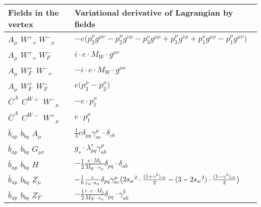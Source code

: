 \textwidth 17cm
\textheight 25cm
\hoffset -3cm
\voffset -1cm
\pagestyle{empty}

\begin{center}

\begin{tabular}{|l|l|} \hline
Fields in the vertex & Variational derivative of Lagrangian by fields \\ \hline
${A}_{\mu }$ \phantom{-} $W^+{}_{\nu }$ \phantom{-} $W^-{}_{\rho }$ \phantom{-}  &
	$- e\big(p_2^\rho g^{\mu \nu} -p_2^\mu g^{\nu \rho} -p_3^\nu g^{\mu \rho} +p_3^\mu g^{\nu \rho} +p_1^\nu g^{\mu \rho} -p_1^\rho g^{\mu \nu} \big)$\\[2mm]
${A}_{\mu }$ \phantom{-} $W^+{}_{\nu }$ \phantom{-} $W^-_F{}_{}$ \phantom{-}  &
	$ i \cdot e \cdot M_W\cdot g^{\mu \nu} $\\[2mm]
${A}_{\mu }$ \phantom{-} $W^+_F{}_{}$ \phantom{-} $W^-{}_{\nu }$ \phantom{-}  &
	$- i \cdot e \cdot M_W\cdot g^{\mu \nu} $\\[2mm]
${A}_{\mu }$ \phantom{-} $W^+_F{}_{}$ \phantom{-} $W^-_F{}_{}$ \phantom{-}  &
	$ e\big(p_3^\mu -p_2^\mu \big)$\\[2mm]
$\bar{C}^A{}_{}$ \phantom{-} $C^{W+}{}_{}$ \phantom{-} $W^-{}_{\mu }$ \phantom{-}  &
	$- e\cdot p_1^\mu $\\[2mm]
$\bar{C}^A{}_{}$ \phantom{-} $C^{W-}{}_{}$ \phantom{-} $W^+{}_{\mu }$ \phantom{-}  &
	$ e\cdot p_1^\mu $\\[2mm]
$\bar{b}{}_{a p }$ \phantom{-} $b{}_{b q }$ \phantom{-} ${A}_{\mu }$ \phantom{-}  &
	$\frac{1}{3} e\delta_{p q} \gamma_{a c}^\mu \cdot \delta_{c b} $\\[2mm]
$\bar{b}{}_{a p }$ \phantom{-} $b{}_{b q }$ \phantom{-} ${G}_{\mu r }$ \phantom{-}  &
	$ g_s\cdot \lambda_{p q}^r \gamma_{a b}^\mu $\\[2mm]
$\bar{b}{}_{a p }$ \phantom{-} $b{}_{b q }$ \phantom{-} ${H}_{}$ \phantom{-}  &
	$-\frac{1}{2}\frac{ e \cdot M_b}{ M_W \cdot s_w}\delta_{p q} \cdot \delta_{a b} $\\[2mm]
$\bar{b}{}_{a p }$ \phantom{-} $b{}_{b q }$ \phantom{-} ${Z}_{\mu }$ \phantom{-}  &
	$-\frac{1}{6}\frac{ e}{ c_w \cdot s_w}\delta_{p q} \gamma_{a c}^\mu \big(2 s_w{}^2 \cdot {(1+\gamma^5)_{c b}\over 2} - (3-2 s_w {}^2)\cdot {(1-\gamma^5)_{c b}\over 2} \big)$\\[2mm]
$\bar{b}{}_{a p }$ \phantom{-} $b{}_{b q }$ \phantom{-} $Z_F{}_{}$ \phantom{-}  &
	$-\frac{1}{2}\frac{ i \cdot e \cdot M_b}{ M_W \cdot s_w}\delta_{p q} \cdot \gamma_{a b}^5 $\\[2mm]

\end{tabular}
\end{center}

